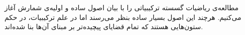 \p
مطالعه‌ی ریاضیات گسسته ترکیبیاتی را با بیان اصول ساده و اولیه‌ی شمارش آغاز می‌کنیم.
هرچند این اصول بسیار ساده بنظر می‌رسند اما در علم ترکیبیات، در حکم ستون‌هایی هستند
که تمام قضایای پیچیده‌تر بر مبنای آن‌ها بنا شده‌اند.







